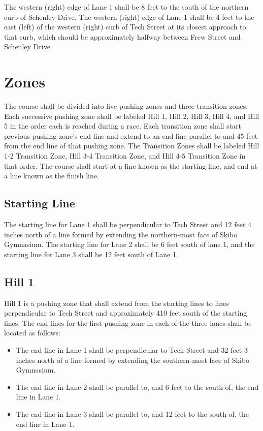 	The western (right) edge of Lane 1 shall be 8 feet to the south of the northern
	curb of Schenley Drive. The western (right) edge of Lane 1 shall be 4 feet to
	the east (left) of the western (right) curb of Tech Street at its closest
	approach to that curb, which should be approximately halfway between Frew
	Street and Schenley Drive.

\section{Zones}

	The course shall be divided into five pushing zones and three transition zones. 
	Each successive pushing zone shall be labeled Hill 1, Hill 2, Hill 3, Hill 4, and 
	Hill 5 in the order each is reached during a race. Each transition zone shall 
	start previous pushing zone's end line and extend to an end line parallel to and 
	45 feet from the end line of that pushing zone. The Transition Zones 
	shall be labeled Hill 1-2 Transition Zone, Hill 3-4 Transition Zone, and 
	Hill 4-5 Transition Zone in that order. The course shall start at a line known as 
	the starting line, and end at a line known as the finish line.

\subsection{Starting Line}

	The starting line for Lane 1 shall be perpendicular to Tech Street and 12 feet
	4 inches north of a line formed by extending the northern-most face of Skibo
	Gymnasium. The starting line for Lane 2 shall be 6 feet south of lane 1, and
	the starting line for Lane 3 shall be 12 feet south of Lane 1.

\subsection{Hill 1}

	Hill 1 is a pushing zone that shall extend from the starting lines to lines 
	perpendicular to Tech Street and approximately 410 feet south of the starting lines. 
	The end lines for the first pushing zone in each of the three lanes shall be located 
	as follows:

	\begin{itemize}
	
		\item
		The end line in Lane 1 shall be perpendicular to Tech Street and 32 feet 3
		inches north of a line formed by extending the southern-most face of Skibo
		Gymnasium.

		\item
		The end line in Lane 2 shall be parallel to, and 6 feet to the south of, the
		end line in Lane 1.
		
		\item
		The end line in Lane 3 shall be parallel to, and 12 feet to the south of, the
		end line in Lane 1.

	\end{itemize}

